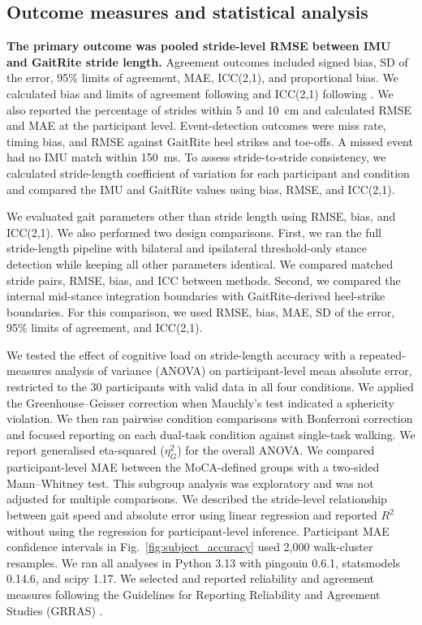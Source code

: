 \documentclass[fleqn,10pt,lineno]{wlpeerj}
\begin{document}
\subsection{Outcome measures and statistical analysis}\label{sec:outcomes}

\textbf{The primary outcome was pooled stride-level RMSE between IMU and GaitRite stride length.} Agreement outcomes included signed bias, SD of the error, 95\% limits of agreement, MAE, ICC(2,1), and proportional bias. We calculated bias and limits of agreement following \citet{Bland1986} and ICC(2,1) following \citet{Shrout1979}. We also reported the percentage of strides within 5 and 10~cm and calculated RMSE and MAE at the participant level. Event-detection outcomes were miss rate, timing bias, and RMSE against GaitRite heel strikes and toe-offs. A missed event had no IMU match within 150~ms. To assess stride-to-stride consistency, we calculated stride-length coefficient of variation for each participant and condition and compared the IMU and GaitRite values using bias, RMSE, and ICC(2,1).

We evaluated gait parameters other than stride length using RMSE, bias, and ICC(2,1). We also performed two design comparisons. First, we ran the full stride-length pipeline with bilateral and ipsilateral threshold-only stance detection while keeping all other parameters identical. We compared matched stride pairs, RMSE, bias, and ICC between methods. Second, we compared the internal mid-stance integration boundaries with GaitRite-derived heel-strike boundaries. For this comparison, we used RMSE, bias, MAE, SD of the error, 95\% limits of agreement, and ICC(2,1).

We tested the effect of cognitive load on stride-length accuracy with a repeated-measures analysis of variance (ANOVA) on participant-level mean absolute error, restricted to the 30 participants with valid data in all four conditions. We applied the Greenhouse--Geisser correction when Mauchly's test indicated a sphericity violation. We then ran pairwise condition comparisons with Bonferroni correction and focused reporting on each dual-task condition against single-task walking. We report generalised eta-squared ($\eta^2_G$) for the overall ANOVA. We compared participant-level MAE between the MoCA-defined groups with a two-sided Mann--Whitney test. This subgroup analysis was exploratory and was not adjusted for multiple comparisons. We described the stride-level relationship between gait speed and absolute error using linear regression and reported $R^2$ without using the regression for participant-level inference. Participant MAE confidence intervals in Fig.~\ref{fig:subject_accuracy} used 2{,}000 walk-cluster resamples. We ran all analyses in Python 3.13 with pingouin 0.6.1, statsmodels 0.14.6, and scipy 1.17. We selected and reported reliability and agreement measures following the Guidelines for Reporting Reliability and Agreement Studies (GRRAS) \citep{Kottner2011}.
\end{document}
